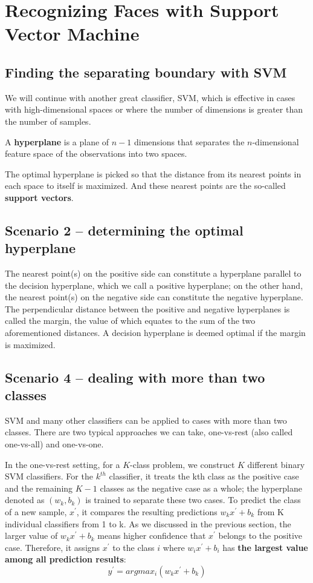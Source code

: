 \chapter{Recognizing Faces with Support Vector Machine\label{Ch03}}
\section{Finding the separating boundary with SVM}
We will continue with another great classifier, SVM, which is effective in cases with high-dimensional spaces or where the number of dimensions is greater than the number of samples.

A \textbf{hyperplane} is a plane of $n - 1$ dimensions that separates the $n$-dimensional feature space of the observations into two spaces.

The optimal hyperplane is picked so that the distance from its nearest points in each space to itself is maximized. And these nearest points are the so-called \textbf{support vectors}.

\section{Scenario 2 – determining the optimal hyperplane}
The nearest point(s) on the positive side can constitute a hyperplane parallel to the decision hyperplane, which we call a positive hyperplane; on the other hand, the nearest point(s) on the negative side can constitute the negative hyperplane. The perpendicular distance between the positive and negative hyperplanes is called the margin, the value of which equates to the sum of the two aforementioned distances. A decision hyperplane is deemed optimal if the margin is maximized.


\section{Scenario 4 – dealing with more than two classes}
SVM and many other classifiers can be applied to cases with more than two classes.
There are two typical approaches we can take, one-vs-rest (also called one-vs-all) and one-vs-one.

In the one-vs-rest setting, for a $K$-class problem, we construct $K$ different binary SVM classifiers. For the $k^{th}$ classifier, it treats the kth class as the positive case and the remaining $K-1$ classes as the negative case as a whole; the hyperplane denoted as $(w_k, b_k)$ is trained to separate these two cases. To predict the class of a new sample, $x^{\prime}$, it compares the resulting predictions $w_kx^{\prime}+b_k$ from K individual classifiers from 1 to k. As we discussed in the previous section, the larger value of $w_kx^{\prime}+b_k$ means higher confidence that $x^{\prime}$ belongs to the positive case. Therefore, it assigns $x^{\prime}$ to the class $i$ where $w_ix^{\prime}+b_i$ has \textbf{the largest value among all prediction results}:
$$y^{\prime}=argmax_i(w_kx^{\prime}+b_k)$$

